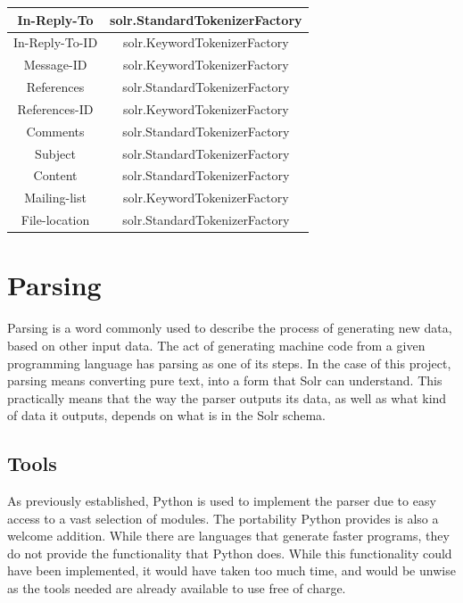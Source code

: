 \documentclass[a4paper,english]{report}
\begin{document}
\begin{center}
\begin{tabular}{||c c||}
\hline 
In-Reply-To & solr.StandardTokenizerFactory\\

\hline
In-Reply-To-ID & solr.KeywordTokenizerFactory\\


\hline 
Message-ID &  solr.KeywordTokenizerFactory\\

\hline 
 References &  solr.StandardTokenizerFactory \\

\hline 
 References-ID &  solr.KeywordTokenizerFactory \\

\hline 
Comments &  solr.StandardTokenizerFactory \\

\hline 
Subject &  solr.StandardTokenizerFactory \\

\hline 
Content &  solr.StandardTokenizerFactory \\

\hline 
Mailing-list & solr.KeywordTokenizerFactory \\

\hline
File-location &  solr.StandardTokenizerFactory \\
\hline
\end{tabular}
\end{center}


\chapter{Parsing}
Parsing is a word commonly used to describe the process of generating new data, based on other input data. The act of generating machine code from a given programming language has parsing as one of its steps.
In the case of this project, parsing means converting pure text, into a form that Solr can understand. This practically means that the way the parser outputs its data, as well as what kind of data it outputs, depends on what is in the Solr schema.

\section{Tools}


As previously established, Python is used to implement the parser due to easy access to a vast selection of modules. The portability Python provides is also a welcome addition. While there are languages that generate faster programs, they do not provide the functionality that Python does. While this functionality could have been implemented, it would have taken too much time, and would be unwise as the tools needed are already available to use free of charge.
\end{document}
